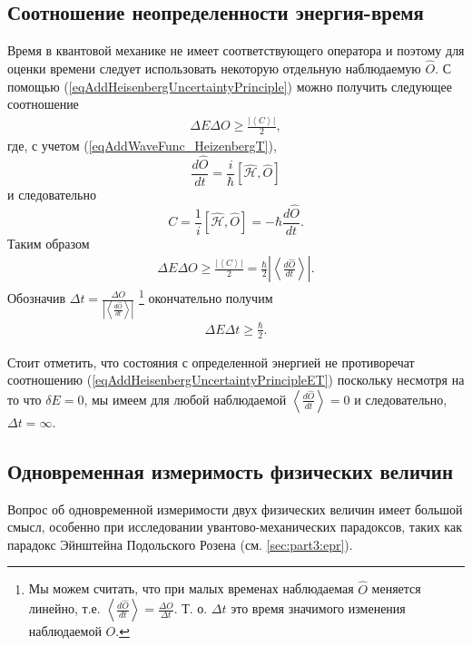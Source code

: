 \subsection{Соотношение неопределенности энергия-время}
\label{AddHeisenbergUncertaintyPrincipleEnergyTime}
Время в квантовой механике не имеет соответствующего оператора и
поэтому для оценки времени следует использовать некоторую отдельную
наблюдаемую $\hat{O}$. С помощью
(\ref{eqAddHeisenbergUncertaintyPrinciple}) можно получить следующее
соотношение
\begin{eqnarray}
  \Delta E \Delta O \ge \frac{\left|\left< C \right>\right|}{2},
  \nonumber
\end{eqnarray}
где, с учетом (\ref{eqAddWaveFunc_HeizenbergT}),
\[
\frac{d \hat{O}}{d t} = \frac{i}{\hbar}
\left[\hat{\mathcal{H}}, \hat{O}\right]
\]
и следовательно
\[
C = \frac{1}{i}\left[\hat{\mathcal{H}}, \hat{O}\right] =
- \hbar \frac{d \hat{O}}{d t}.
\]
Таким образом
\begin{eqnarray}
  \Delta E \Delta O \ge \frac{\left|\left< C \right>\right|}{2} =
  \frac{\hbar}{2}\left|\left<\frac{d \hat{O}}{d t}\right>\right|.
  \nonumber
\end{eqnarray}
Обозначив $\Delta t = \frac{\Delta O}{\left|\left<\frac{d \hat{O}}{d
    t}\right>\right|}$
\footnote{
  Мы можем считать, что при малых временах наблюдаемая $\hat{O}$
  меняется линейно, т.е. $\left<\frac{d \hat{O}}{dt}\right> =
  \frac{\Delta O}{\Delta t}$. Т. о. $\Delta t$ это время значимого
  изменения наблюдаемой $O$. 
}
окончательно получим
\begin{eqnarray}
  \Delta E \Delta t \ge \frac{\hbar}{2}.
  \label{eqAddHeisenbergUncertaintyPrincipleET}
\end{eqnarray}

Стоит отметить, что состояния с определенной энергией не противоречат
соотношению (\ref{eqAddHeisenbergUncertaintyPrincipleET}) поскольку
несмотря на то что $\delta E = 0$, мы имеем для любой наблюдаемой
$\left<\frac{d \hat{O}}{dt}\right> = 0$ и следовательно, $\Delta t =
\infty$. 

\subsection{Одновременная измеримость физических величин}
\label{AddHeisenbergUncertaintyPrincipleMesuranmet}
Вопрос об одновременной измеримости двух физических
величин имеет большой смысл, особенно при исследовании
увантово-механических парадоксов, таких как парадокс
Эйнштейна Подольского Розена (см. \autoref{sec:part3:epr}).

